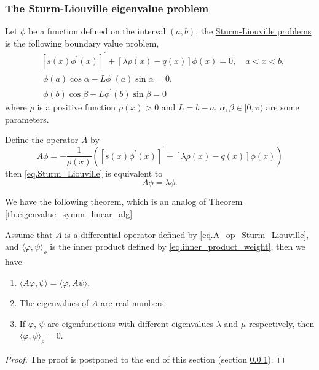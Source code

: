 \subsubsection{The Sturm-Liouville eigenvalue problem}\label{sec.Sturm_Liouville}

\begin{definition}
Let $\phi$ be a function defined on the interval $(a, b)$, the \underline{Sturm-Liouville problems} is the following boundary value problem,
\begin{equation}\label{eq.Sturm_Liouville}
    \begin{split}
        &\left[s(x) \phi^{\prime}(x)\right]^{\prime}+[\lambda \rho(x)-q(x)] \phi(x)=0, \quad a<x<b,
        \\
        &\ \phi(a) \cos \alpha-L \phi^{\prime}(a) \sin \alpha=0,
        \\
        &\ \phi(b) \cos \beta+L \phi^{\prime}(b) \sin \beta=0
    \end{split}
\end{equation}
where $\rho$ is a positive function $\rho(x)>0$ and $L=b-a$, $\alpha, \beta \in[0, \pi)$ are some parameters. 
\end{definition}

Define the operator $A$ by 
\begin{equation}\label{eq.A_op_Sturm_Liouville}
    A \phi = - \frac{1}{\rho(x)}\left(\left[s(x) \phi^{\prime}(x)\right]^{\prime}+[\lambda \rho(x)-q(x)] \phi(x)\right)
\end{equation}
then \eqref{eq.Sturm_Liouville} is equivalent to
\begin{equation}\label{eq.Sturm_Liouville'}
    A \phi = \lambda \phi.
\end{equation}

We have the following theorem, which is an analog of Theorem \ref{th.eigenvalue_symm_linear_alg}

\begin{theorem}[]\label{th.eigenvalue_symm} Assume that $A$ is a differential operator defined by \eqref{eq.A_op_Sturm_Liouville}, and $\langle\varphi, \psi\rangle_\rho$ is the inner product defined by \eqref{eq.inner_product_weight}, then we have
\begin{enumerate}
    \item $\langle A \varphi, \psi\rangle = \langle \varphi, A\psi\rangle$.
    \item The eigenvalues of $A$ are real numbers.
    \item If $\varphi$, $\psi$ are eigenfunctions with different eigenvalues $\lambda$ and $\mu$ respectively, then $\langle \varphi, \psi\rangle_\rho = 0$.
\end{enumerate}
\end{theorem}
\begin{proof}
    The proof is postponed to the end of this section (section \ref{sec.Sturm_Liouville}).
\end{proof}



